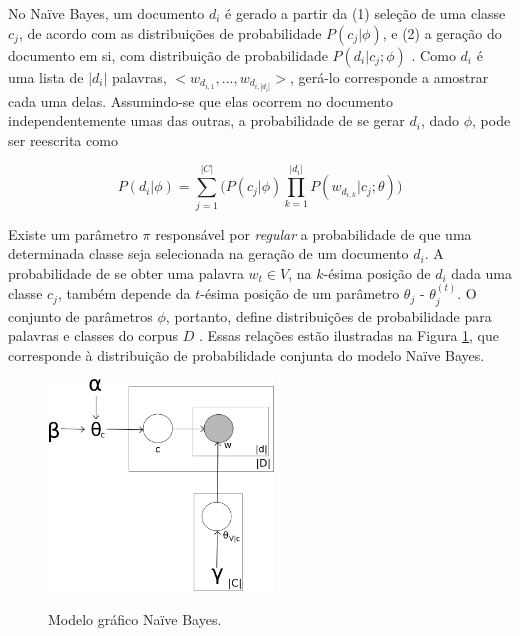 No Naïve Bayes, um documento \ensuremath{d_i} é gerado a partir da (1) seleção de uma classe \ensuremath{c_j}, de acordo com as distribuições de probabilidade \ensuremath{P(c_j | \phi)}, e (2) a geração do documento em si, com distribuição de probabilidade \ensuremath{P(d_i | c_j ; \phi)} \cite{mccallum-nigam}. Como \ensuremath{d_i} é uma lista de \ensuremath{|d_i|} palavras, \ensuremath{< w_{d_{i,1}}, ..., w_{d_{i,|d_i|}} >}, gerá-lo  corresponde a amostrar cada uma delas. Assumindo-se que elas ocorrem no documento independentemente umas das outras, a probabilidade de se gerar  \ensuremath{d_i}, dado \ensuremath{\phi}, pode ser reescrita como \cite{nigam}  

\begin{equation}
\label{gerando-di}
\ensuremath{P(d_i | \phi) = \sum_{j = 1}^{|C|}\bigg(P(c_j | \phi)\prod_{k = 1}^{|d_i|}P(w_{d_{i,k}} | c_j ; \theta)\bigg)}
\end{equation}

Existe um parâmetro \ensuremath{\pi} responsável por \emph{regular} a probabilidade de que uma determinada classe seja selecionada na geração de um documento \ensuremath{d_i}. A probabilidade de se obter uma palavra \ensuremath{w_t \in V}, na \ensuremath{k}-ésima posição de \ensuremath{d_i} dada uma classe \ensuremath{c_j}, também depende da \ensuremath{t}-ésima posição de um parâmetro \ensuremath{\theta_j} - \ensuremath{\theta_j^{(t)}}. O conjunto de parâmetros \ensuremath{\phi}, portanto, define distribuições de probabilidade para palavras e classes do corpus \ensuremath{D} \cite{nigam}. Essas relações estão ilustradas na Figura \ref{naive:joint}, que corresponde à distribuição de probabilidade conjunta do modelo Naïve Bayes.

\begin{figure}[h]
 \centering %
 \includegraphics[width=6cm, height=5.6cm]{naive-joint.png}\\
 \caption{Modelo gráfico Naïve Bayes.}
 \label{naive:joint}
\end{figure}


